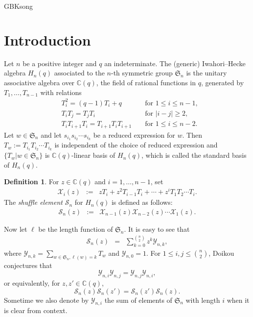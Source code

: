 \documentclass[13pt,a4paper, oneside]{amsart}       %
\numberwithin{equation}{section}
\theoremstyle{definition}
\newtheorem{definition}[equation]{Definition}
\theoremstyle{remark}
\begin{document}
\begin{CJK*}{GBK}{song}
\section{Introduction}
Let $n$ be a positive integer and $q$ an indeterminate. The (generic) Iwahori--Hecke algebra $H_n(q)$ associated to the $n$-th symmetric group $\mathfrak{S}_n$ is the unitary associative algebra over $\mathbb{C}(q)$, the field of rational functions in $q$, generated by $T_1, \ldots, T_{n-1}$ with relations
 \begin{align*}&T_i^2=(q-1)T_i+q &&\text{ for }1\leq i\leq n-1,\\
&T_iT_j=T_jT_i &&\text{ for }|i-j|\geq 2,\\
 &T_iT_{i+1}T_i=T_{i+1}T_{i}T_{i+1} &&\text{ for }1\leq i\leq n-2.\end{align*}
Let $w\in \mathfrak{S}_n$ and let $s_{i_1}s_{i_2}\cdots s_{i_k}$ be a reduced expression for $w$. Then $T_{w}:=T_{i_1}T_{i_2}\cdots T_{i_k}$ is independent of the choice of reduced expression and  $\{T_{w}|w\in \mathfrak{S}_n\}$ is $\mathbb{C}(q)$-linear basis of $H_n(q)$, which is called the standard basis of $H_n(q)$.



\begin{definition}\label{Def:Shuffle}
 For $z\in \mathbb{C}(q)$ and $i=1,\ldots, n-1$, set
\begin{eqnarray*}
\mathscr{X}_i(z)&:=&zT_i+z^2T_{i-1}T_{i}+\cdots+z^iT_1T_2\cdots T_i.
\end{eqnarray*}
The  \textit{shuffle element}  $\mathscr{S}_n$ for $H_n(q)$ is defined as follows: \begin{eqnarray*}
\mathscr{S}_n(z)&:=&\mathscr{X}_{n-1}(z)\mathscr{X}_{n-2}(z)\cdots\mathscr{X}_{1}(z).
\end{eqnarray*}\end{definition}


Now let $\ell$ be the  length function of $\mathfrak{S}_n$. It is easy to see that
\begin{eqnarray}\label{Equ:Shuffle=sum}
\mathscr{S}_n(z)&=&\sum_{k=0}^{\binom{n}{2}}z^k\mathscr{Y}_{n,k},
\end{eqnarray}
where $\mathscr{Y}_{n,k}=\sum_{w\in\mathfrak{S}_n, \ell(w)=k}T_{w}$ and $\mathscr{Y}_{n,0}=1$. For $1\leq i,j\leq \binom{n}{2}$, Doikou   \cite[Conjecture~5.7]{Doikou} conjectures that
 \begin{equation*}
 \mathscr{Y}_{n,i}\mathscr{Y}_{n,j}=\mathscr{Y}_{n,j}\mathscr{Y}_{n,i},
 \end{equation*} or equivalently,  for $z,z'\in \mathbb{C}(q)$,
\begin{equation*}
\mathscr{S}_n(z)\mathscr{S}_n(z')=\mathscr{S}_n(z')\mathscr{S}_n(z).
\end{equation*}
Sometime we also denote by $\mathscr{Y}_{n,i}$ the sum of elements of $\mathfrak{S}_n$ with length $i$ when it is clear from context.


\end{CJK*}
\end{document}
